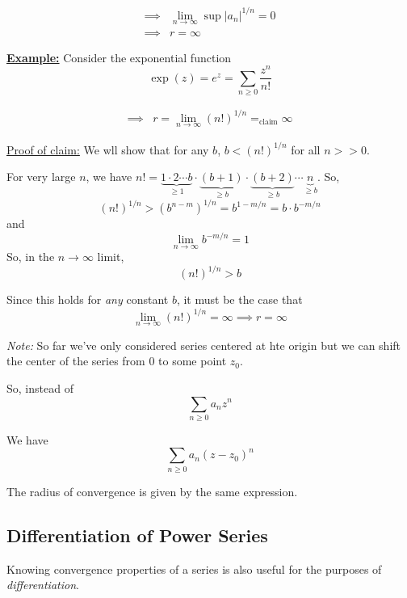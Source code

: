 \documentclass{article}
\begin{document}
\begin{align*}
  \implies &\lim_{n \rightarrow \infty} \sup |a_n|^{1/n} = 0 \\
  \implies & r = \infty
\end{align*}

\vskip 0.5cm
\underline{\textbf{Example:}} Consider the exponential function
\[ \exp(z) = e^{z} = \sum_{n \geq 0} \frac{z^n}{n!} \]

\begin{align*}
  \implies &r = \lim_{n \rightarrow \infty} (n!)^{1/n} =_{\text{claim}} \infty
\end{align*}

\vskip 0.5cm
\underline{Proof of claim:} We wll show that for any $b$, $b < (n!)^{1/n}$ for all $n >> 0$.


For very large $n$, we have $n! = \underbrace{1 \cdot 2 \cdots b}_{\geq 1} \cdot \underbrace{(b+1)}_{\geq b} \cdot \underbrace{(b+2)}_{\geq b} \cdots \underbrace{n}_{\geq b}$. So, 
\[ \left(n!\right)^{1/n} > \left(b^{n-m}\right)^{1/n} = b^{1-m/n}= b \cdot b^{-m/n}\]
and
\[ \lim_{n \rightarrow \infty} b^{-m/n} = 1 \]
So, in the $n \rightarrow \infty$ limit, 
\[ \left(n!\right)^{1/n} > b \]

Since this holds for \emph{any} constant $b$, it must be the case that 
\[ \lim_{n \rightarrow \infty} \left(n!\right)^{1/n} = \infty \implies \boxed{r = \infty} \]


\vskip 0.5cm
\begin{dottedbox}
  \emph{Note:} So far we've only considered series centered at hte origin but  we can shift the center of the series from $0$ to some point $z_0$.

So, instead of 
\[ \sum_{n \geq 0} a_n z^n \]

We have
\[ \sum_{n \geq 0} a_n (z - z_0)^n \]

The radius of convergence is given by the same expression.
\end{dottedbox}

\vskip 1cm
\subsection{Differentiation of Power Series}
Knowing convergence properties of a series is also useful for the purposes of \emph{differentiation}.
\end{document}
